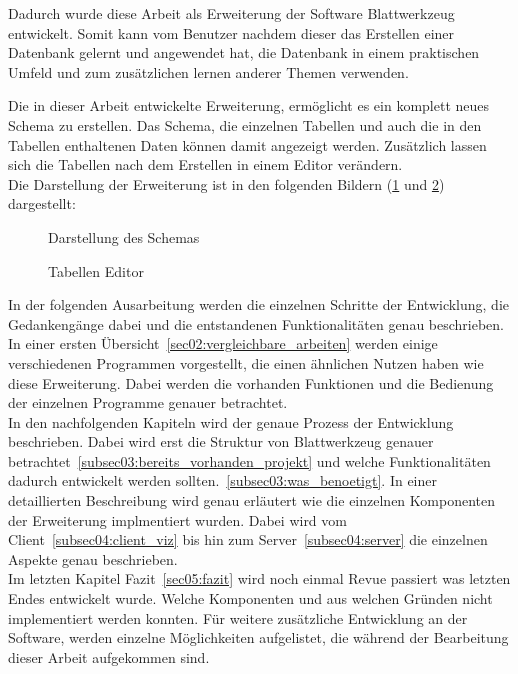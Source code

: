Dadurch wurde diese Arbeit als Erweiterung der Software Blattwerkzeug entwickelt. Somit kann vom Benutzer nachdem dieser das Erstellen einer Datenbank gelernt und angewendet hat, die Datenbank in einem praktischen Umfeld und zum zusätzlichen lernen anderer Themen verwenden.

Die in dieser Arbeit entwickelte Erweiterung, ermöglicht es ein komplett neues Schema zu erstellen. Das Schema, die einzelnen Tabellen und auch die in den Tabellen enthaltenen Daten können damit angezeigt werden. Zusätzlich lassen sich die Tabellen nach dem Erstellen in einem Editor verändern. \\
Die Darstellung der Erweiterung ist in den folgenden Bildern (\ref{pic:schema_preview} und \ref{pic:table_editor_preview}) dargestellt:

\begin{figure}[ht]
        \centering
        \caption{Darstellung des Schemas}
        \label{pic:schema_preview}
\end{figure}

\begin{figure}[ht]
        \centering
        \caption{Tabellen Editor}
        \label{pic:table_editor_preview}
\end{figure}



In der folgenden Ausarbeitung werden die einzelnen Schritte der Entwicklung, die Gedankengänge dabei und die entstandenen Funktionalitäten genau beschrieben. \\
In einer ersten Übersicht~\ref{sec02:vergleichbare_arbeiten} werden einige verschiedenen Programmen vorgestellt, die einen ähnlichen Nutzen haben wie diese Erweiterung. Dabei werden die vorhanden Funktionen und die Bedienung der einzelnen Programme genauer betrachtet.\\
In den nachfolgenden Kapiteln wird der genaue Prozess der Entwicklung beschrieben. Dabei wird erst die Struktur von Blattwerkzeug genauer betrachtet~\ref{subsec03:bereits_vorhanden_projekt} und welche Funktionalitäten dadurch entwickelt werden sollten.~\ref{subsec03:was_benoetigt}.
In einer detaillierten Beschreibung wird genau erläutert wie die einzelnen Komponenten der Erweiterung implmentiert wurden. Dabei wird vom Client~\ref{subsec04:client_viz} bis hin zum Server~\ref{subsec04:server} die einzelnen Aspekte genau beschrieben. \\
Im letzten Kapitel Fazit~\ref{sec05:fazit} wird noch einmal Revue passiert was letzten Endes entwickelt wurde. Welche Komponenten und aus welchen Gründen nicht implementiert werden konnten. Für weitere zusätzliche Entwicklung an der Software, werden einzelne Möglichkeiten aufgelistet, die während der Bearbeitung dieser Arbeit aufgekommen sind.

